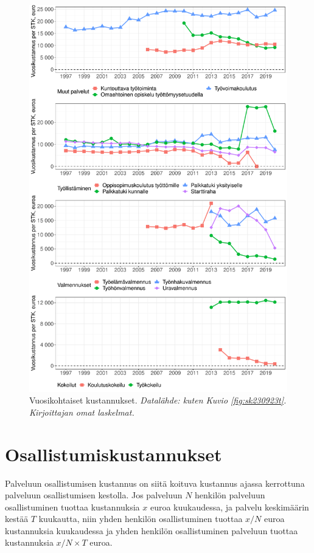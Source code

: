\documentclass[12pt]{article}
\newcommand{\captionselite}[1] {\textit{\footnotesize{#1}}}
\begin{document}
\begin{figure}
\centering
\includegraphics[scale = 0.6]{../plots/costs/annual_per_stock_costs.pdf}
\caption{Vuosikohtaiset kustannukset. \captionselite{Datalähde: kuten Kuvio \ref{fig:sk230923t}. Kirjoittajan omat laskelmat.}}
   \label{fig:dl2092g}
\end{figure}

\section{Osallistumiskustannukset}

Palveluun osallistumisen kustannus on siitä koituva kustannus ajassa kerrottuna palveluun osallistumisen kestolla. Jos palveluun $N$ henkilön palveluun osallistuminen tuottaa kustannuksia $x$ euroa kuukaudessa, ja palvelu keskimäärin kestää $T$ kuukautta, niin yhden henkilön osallistuminen tuottaa $x/N$ euroa kustannuksia kuukaudessa ja yhden henkilön osallistuminen palveluun tuottaa kustannuksia $x/N \times T$ euroa.
\end{document}
